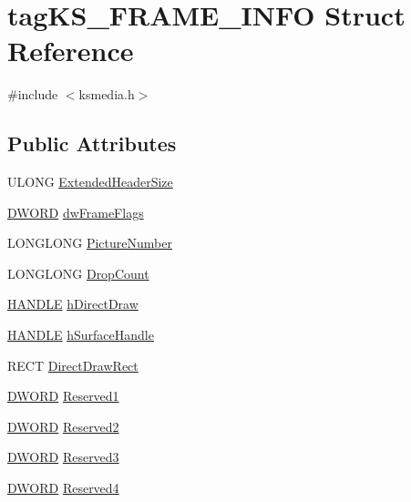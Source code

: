 \hypertarget{structtag_k_s___f_r_a_m_e___i_n_f_o}{}\section{tag\+K\+S\+\_\+\+F\+R\+A\+M\+E\+\_\+\+I\+N\+FO Struct Reference}
\label{structtag_k_s___f_r_a_m_e___i_n_f_o}


{\ttfamily \#include $<$ksmedia.\+h$>$}

\subsection*{Public Attributes}
\begin{DoxyCompactItemize}
\item 
U\+L\+O\+NG \hyperlink{structtag_k_s___f_r_a_m_e___i_n_f_o_afa44189766ee54a822f030e6cc5f41e0}{Extended\+Header\+Size}
\item 
\hyperlink{mapinls_8h_ad342ac907eb044443153a22f964bf0af}{D\+W\+O\+RD} \hyperlink{structtag_k_s___f_r_a_m_e___i_n_f_o_a3a50f52d2afdc4d186ac54d875b7fbaf}{dw\+Frame\+Flags}
\item 
L\+O\+N\+G\+L\+O\+NG \hyperlink{structtag_k_s___f_r_a_m_e___i_n_f_o_aae3fb36ed8f84f35b82e548d1a5375ca}{Picture\+Number}
\item 
L\+O\+N\+G\+L\+O\+NG \hyperlink{structtag_k_s___f_r_a_m_e___i_n_f_o_af4b5f5aeaf4b623fb87766d9b5f19a41}{Drop\+Count}
\item 
\hyperlink{_sound_touch_d_l_l_8h_aa8c0374618b33785ccb02f74bcfebc46}{H\+A\+N\+D\+LE} \hyperlink{structtag_k_s___f_r_a_m_e___i_n_f_o_ab534f79a08a2c4929a92e267b4045639}{h\+Direct\+Draw}
\item 
\hyperlink{_sound_touch_d_l_l_8h_aa8c0374618b33785ccb02f74bcfebc46}{H\+A\+N\+D\+LE} \hyperlink{structtag_k_s___f_r_a_m_e___i_n_f_o_a1875e5986c03a09d88eb89a13db527c3}{h\+Surface\+Handle}
\item 
R\+E\+CT \hyperlink{structtag_k_s___f_r_a_m_e___i_n_f_o_a5976a9d3e80575e90690c7d5a7050759}{Direct\+Draw\+Rect}
\item 
\hyperlink{mapinls_8h_ad342ac907eb044443153a22f964bf0af}{D\+W\+O\+RD} \hyperlink{structtag_k_s___f_r_a_m_e___i_n_f_o_a6469e953f2d56616722570f4b4584336}{Reserved1}
\item 
\hyperlink{mapinls_8h_ad342ac907eb044443153a22f964bf0af}{D\+W\+O\+RD} \hyperlink{structtag_k_s___f_r_a_m_e___i_n_f_o_a5f1349ad5047b60bf95c0829e23dc50b}{Reserved2}
\item 
\hyperlink{mapinls_8h_ad342ac907eb044443153a22f964bf0af}{D\+W\+O\+RD} \hyperlink{structtag_k_s___f_r_a_m_e___i_n_f_o_aa3533daedcbecc9790f8a6df121c203d}{Reserved3}
\item 
\hyperlink{mapinls_8h_ad342ac907eb044443153a22f964bf0af}{D\+W\+O\+RD} \hyperlink{structtag_k_s___f_r_a_m_e___i_n_f_o_a8c5710fb97000b6c74781fec6e18fe4c}{Reserved4}
\end{DoxyCompactItemize}


